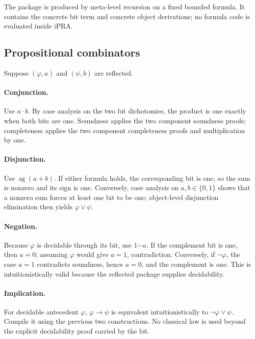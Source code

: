 The package is produced by meta-level recursion on a fixed bounded formula.  It contains the concrete
bit term and concrete object derivations; no formula code is evaluated inside iPRA.

\subsection{Propositional combinators}

Suppose \((\varphi,a)\) and \((\psi,b)\) are reflected.

\paragraph{Conjunction.}
Use \(a\cdot b\).  By case analysis on the two bit dichotomies, the product is one exactly when both
bits are one.  Soundness applies the two component soundness proofs; completeness applies the two
component completeness proofs and multiplication by one.

\paragraph{Disjunction.}
Use \(\operatorname{sg}(a+b)\).  If either formula holds, the corresponding bit is one, so the sum is
nonzero and its sign is one.  Conversely, case analysis on \(a,b\in\{0,1\}\) shows that a nonzero sum
forces at least one bit to be one; object-level disjunction elimination then yields
\(\varphi\lor\psi\).

\paragraph{Negation.}
Because \(\varphi\) is decidable through its bit, use \(1\mathbin{\dot-}a\).  If the complement bit is
one, then \(a=0\); assuming \(\varphi\) would give \(a=1\), contradiction.  Conversely, if
\(\neg\varphi\), the case \(a=1\) contradicts soundness, hence \(a=0\), and the complement is one.
This is intuitionistically valid because the reflected package supplies decidability.

\paragraph{Implication.}
For decidable antecedent \(\varphi\), \(\varphi\to\psi\) is equivalent intuitionistically to
\(\neg\varphi\lor\psi\).  Compile it using the previous two constructions.  No classical law is
used beyond the explicit decidability proof carried by the bit.

